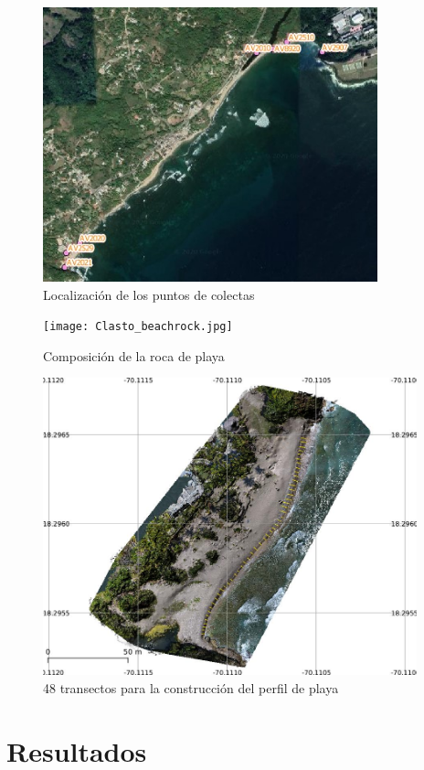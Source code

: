 \documentclass[11pt,]{article}
\begin{document}
\begin{figure}
\centering
\includegraphics[height=3.12500in]{areas_muestras_colectadas.jpg}
\caption{Localización de los puntos de colectas\label{muestras}}
\end{figure}

\begin{figure}
\centering
\texttt{[image: Clasto\_beachrock.jpg]}
\caption{Composición de la roca de playa\label{clasto}}
\end{figure}

\begin{figure}
\centering
\includegraphics[height=3.38542in]{costa_transecto.jpg}
\caption{48 transectos para la construcción del perfil de
playa\label{carlo}}
\end{figure}

\section{Resultados}\label{resultados}
\end{document}
